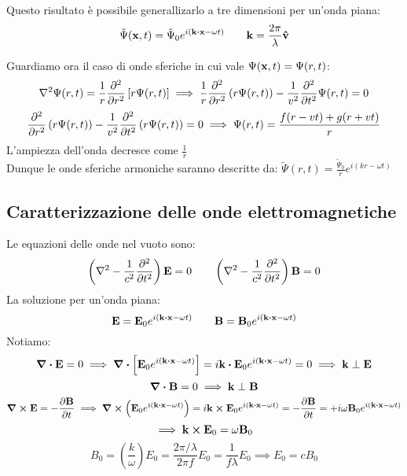 \documentclass[12pt,a4paper]{article}
\begin{document}
Questo risultato è possibile generallizarlo a tre dimensioni per un'onda piana:
\begin{equation*}
    \tilde{\Psi}(\vb{x},t)= \tilde{\Psi}_0 e^{i\left( \vb{k}\vdot\vb{x}-\omega t \right)} \qquad \vb{k}= \frac{2\pi}{\lambda}\vu{v}
\end{equation*}

Guardiamo ora il caso di onde sferiche in cui vale $\Psi(\vb{x},t)= \Psi(r,t)$:
\begin{equation*}
    \laplacian{\Psi}(r,t)= \frac{1}{r}\pdv[2]{}{r}\left[ r\Psi(r,t) \right]\implies
    \frac{1}{r}\pdv[2]{}{r}\left( r\Psi(r,t) \right)-\frac{1}{v^2}\pdv[2]{}{t}\Psi(r,t)=0
\end{equation*}
\begin{equation*}
    \pdv[2]{}{r}\left( r\Psi(r,t) \right)-\frac{1}{v^2}\pdv[2]{}{t}\left( r\Psi(r,t) \right)=0\implies
    \Psi(r,t)=\frac{f(r-vt)+g(r+vt)}{r}
\end{equation*}
L'ampiezza dell'onda decresce come $\frac{1}{r}$
\\Dunque le onde sferiche armoniche saranno descritte da: $\tilde{\Psi}(r,t)= \frac{\tilde{\Psi}_0}{r}e^{i\left( kr-\omega t \right)}$

\subsection{Caratterizzazione delle onde elettromagnetiche}
Le equazioni delle onde nel vuoto sono:
\begin{equation*}
    \left( \laplacian{}-\frac{1}{c^2}\pdv[2]{}{t} \right)\vb{E}=0 \qquad\left( \laplacian{}-\frac{1}{c^2}\pdv[2]{}{t} \right)\vb{B}=0
\end{equation*}
La soluzione per un'onda piana:
\begin{equation*}
    \vb{E}= \vb{E}_0e^{i(\vb{k}\vdot\vb{x}-\omega t)}\qquad \vb{B}= \vb{B}_0e^{i(\vb{k}\vdot\vb{x}-\omega t)}
\end{equation*}
Notiamo:
\begin{equation*}
    \div{\vb{E}}=0\implies\div[\vb{E}_0e^{i(\vb{k}\vdot\vb{x}-\omega t)}]= i \vb{k}\vdot\vb{E}_0e^{i(\vb{k}\vdot\vb{x}-\omega t)}= 0 
    \implies \vb{k} \perp \vb{E}
\end{equation*}
\begin{equation*}
    \div{\vb{B}}= 0 \implies \vb{k} \perp \vb{B}
\end{equation*}
\begin{equation*}
    \curl{\vb{E}}= -\pdv{\vb{B}}{t}\implies\curl(\vb{E}_0e^{i(\vb{k}\vdot\vb{x}-\omega t)})= i\vb{k}\cp\vb{E}_0e^{i(\vb{k}\vdot\vb{x}-\omega t)}
    = -\pdv{\vb{B}}{t}=+i \omega\vb{B}_0e^{i(\vb{k}\vdot\vb{x}-\omega t)}
\end{equation*}
\begin{equation*}
    \implies\vb{k}\cp\vb{E}_0= \omega\vb{B}_0
\end{equation*}
\begin{equation*}
    B_0= \left( \frac{k}{\omega} \right)E_0=\frac{2\pi/\lambda}{2\pi f}E_0= \frac{1}{f\lambda}E_0 \implies E_0= c B_0
\end{equation*}
\end{document}
